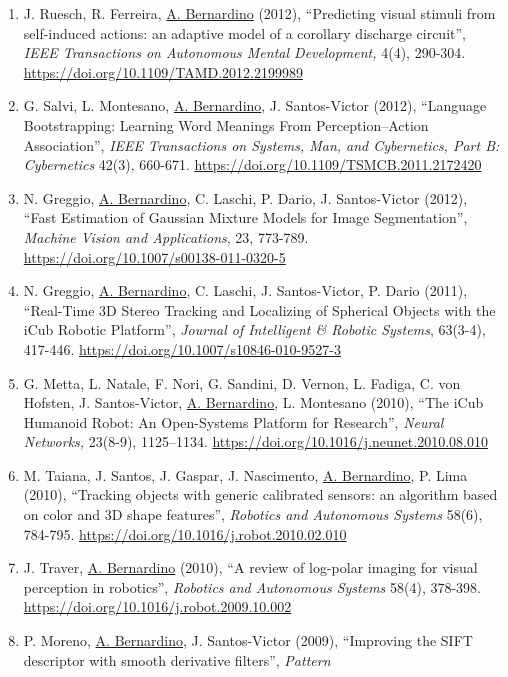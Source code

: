 \begin{enumerate}
  \emph{Adaptive Behavior,} 21(6),452-464.
  \url{https://doi.org/10.1177/1059712313492176}
\item
  J. Ruesch, R. Ferreira, \ul{A. Bernardino} (2012), ``Predicting visual
  stimuli from self-induced actions: an adaptive model of a corollary
  discharge circuit'', \emph{IEEE Transactions on Autonomous Mental
  Development,} 4(4), 290-304.
  \url{https://doi.org/10.1109/TAMD.2012.2199989}
\item
  G. Salvi, L. Montesano, \ul{A. Bernardino}, J. Santos-Victor (2012),
  ``Language Bootstrapping: Learning Word Meanings From
  Perception--Action Association'', \emph{IEEE Transactions on Systems,
  Man, and Cybernetics, Part B: Cybernetics} 42(3), 660-671.
  \url{https://doi.org/10.1109/TSMCB.2011.2172420}
\item
  N. Greggio, \ul{A. Bernardino}, C. Laschi, P. Dario, J. Santos-Victor
  (2012), ``Fast Estimation of Gaussian Mixture Models for Image
  Segmentation'', \emph{Machine Vision and Applications}, 23, 773-789.
  \url{https://doi.org/10.1007/s00138-011-0320-5}
\item
  N. Greggio, \ul{A. Bernardino}, C. Laschi, J. Santos-Victor, P. Dario
  (2011), ``Real-Time 3D Stereo Tracking and Localizing of Spherical
  Objects with the iCub Robotic Platform'', \emph{Journal of Intelligent
  \& Robotic Systems}, 63(3-4), 417-446.
  \url{https://doi.org/10.1007/s10846-010-9527-3}
\item
  G. Metta, L. Natale, F. Nori, G. Sandini, D. Vernon, L. Fadiga, C. von
  Hofsten, J. Santos-Victor, \ul{A. Bernardino}, L. Montesano (2010),
  ``The iCub Humanoid Robot: An Open-Systems Platform for Research'',
  \emph{Neural Networks,} 23(8-9), 1125--1134.
  \url{https://doi.org/10.1016/j.neunet.2010.08.010}
\item
  M. Taiana, J. Santos, J. Gaspar, J. Nascimento, \ul{A. Bernardino}, P.
  Lima (2010), ``Tracking objects with generic calibrated sensors: an
  algorithm based on color and 3D shape features'', \emph{Robotics and
  Autonomous Systems} 58(6), 784-795.
  \url{https://doi.org/10.1016/j.robot.2010.02.010}
\item
  J. Traver, \ul{A. Bernardino} (2010), ``A review of log-polar imaging
  for visual perception in robotics'', \emph{Robotics and Autonomous
  Systems} 58(4), 378-398.
  \url{https://doi.org/10.1016/j.robot.2009.10.002}
\item
  P. Moreno, \ul{A. Bernardino}, J. Santos-Victor (2009), ``Improving
  the SIFT descriptor with smooth derivative filters'', \emph{Pattern
}
\end{enumerate}
